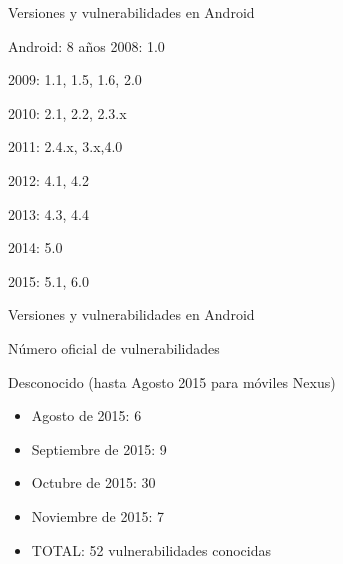 \documentclass{beamer}
\begin{document}
\begin{frame}{Versiones y vulnerabilidades en Android}
	
	\begin{block}{Android: 8 años}
		2008: 1.0
		
		2009: 1.1, 1.5, 1.6, 2.0
		
		2010: 2.1, 2.2, 2.3.x
		
		2011: 2.4.x, 3.x,4.0
		
		2012: 4.1, 4.2
		
		2013: 4.3, 4.4
		
		2014: 5.0
		
		2015: 5.1, 6.0
	\end{block}
		
\end{frame}

\begin{frame}{Versiones y vulnerabilidades en Android}
	
	\begin{alertblock}{Número oficial de vulnerabilidades}
		
		Desconocido (hasta Agosto 2015 para móviles Nexus)
		
		\begin{itemize}[<+-|alert@+>]
			
			\item Agosto de 2015: 6
			\item Septiembre de 2015: 9
			\item Octubre de 2015: 30
			\item Noviembre de 2015: 7
			\item TOTAL: 52 vulnerabilidades conocidas
			
		\end{itemize}
	\end{alertblock}
	
\end{frame}
\end{document}
